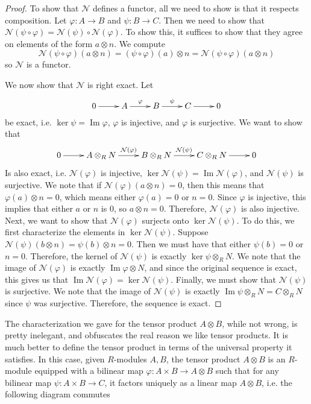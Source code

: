\documentclass[psamsfonts]{amsart}
\theoremstyle{definition}
\theoremstyle{remark}
\DeclareMathOperator{\im}{Im}
\begin{document}
\begin{proof}
To show that $\mathcal{N}$ defines a functor, all we need to show is that it respects composition. Let $\varphi: A \to B$ and $\psi: B \to C$. Then we need to show that $\mathcal{N}(\psi \circ \varphi) = \mathcal{N}(\psi) \circ \mathcal{N}(\varphi)$. To show this, it suffices to show that they agree on elements of the form $a \otimes n$. We compute
$$ \mathcal{N}(\psi \circ \varphi)(a \otimes n) = (\psi \circ \varphi)(a) \otimes n = \mathcal{N}(\psi \circ \varphi)(a \otimes n) $$
so $\mathcal{N}$ is a functor.

We now show that $\mathcal{N}$ is right exact. Let
$$\xymatrix{
0 \ar[r] & A \ar[r]^\varphi & B \ar[r]^\psi & C \ar[r] & 0
}$$
be exact, i.e. $\ker\psi = \im\varphi$, $\varphi$ is injective, and $\varphi$ is surjective. We want to show that
$$\xymatrix{
0 \ar[r] & A \otimes_R N \ar[r]^{\mathcal{N}(\varphi)} & B \otimes_R N \ar[r]^{\mathcal{N}(\psi)} & C \otimes_R N \ar[r] & 0
}$$
Is also exact, i.e. $\mathcal{N}(\varphi)$ is injective, $\ker\mathcal{N}(\psi) = \im\mathcal{N}(\varphi)$, and $\mathcal{N}(\psi)$ is surjective. We note that if $\mathcal{N}(\varphi)(a \otimes n) = 0$, then this means that $\varphi(a) \otimes n = 0$, which means either $\varphi(a) = 0$ or $n = 0$. Since $\varphi$ is injective, this implies that either $a$ or $n$ is $0$, so $a \otimes n = 0$. Therefore, $\mathcal{N}(\varphi)$ is also injective. Next, we want to show that $\mathcal{N}(\varphi)$ surjects onto $\ker\mathcal{N}(\psi)$. To do this, we first characterize the elements in $\ker\mathcal{N}(\psi)$. Suppose $\mathcal{N}(\psi)(b \otimes n) = \psi(b) \otimes n = 0$. Then we must have that either $\psi(b) = 0$ or $n = 0$. Therefore, the kernel of $\mathcal{N}(\psi)$ is exactly $\ker\psi \otimes_R N$. We note that the image of $\mathcal{N}(\varphi)$ is exactly $\im\varphi \otimes N$, and since the original sequence is exact, this gives us that $\im\mathcal{N}(\varphi) = \ker\mathcal{N}(\psi)$. Finally, we must show that $\mathcal{N}(\psi)$ is surjective.  We note that the image of $\mathcal{N}(\psi)$ is exactly $\im\psi \otimes_R N = C \otimes_R N$ since $\psi$ was surjective. Therefore, the sequence is exact.
\end{proof}
The characterization we gave for the tensor product $A \otimes B$, while not wrong, is pretty inelegant, and obfuscates the real reason we like tensor products. It is much better to define the tensor product in terms of the universal property it satisfies. In this case, given $R$-modules $A,B$, the tensor product $A \otimes B$ is an $R$-module equipped with a bilinear map $\varphi: A\times B \to A \otimes B$  such that for any bilinear map $\psi: A \times B \to C$, it factors uniquely as a linear map $A \otimes B$, i.e. the following diagram commutes
\end{document}
